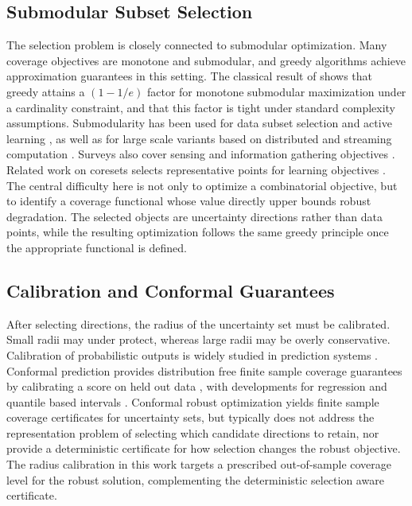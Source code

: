\documentclass[accepted]{uai2026}
\theoremstyle{plain}
\theoremstyle{definition}
\theoremstyle{remark}
\begin{document}
\subsection{Submodular Subset Selection}
The selection problem is closely connected to submodular optimization. Many coverage objectives are monotone and submodular, and greedy algorithms achieve approximation guarantees in this setting. The classical result of \cite{Nemhauser1978} shows that greedy attains a $(1-1/e)$ factor for monotone submodular maximization under a cardinality constraint, and that this factor is tight under standard complexity assumptions.
Submodularity has been used for data subset selection and active learning \citep{Wei2015}, as well as for large scale variants based on distributed and streaming computation \citep{Mirzasoleiman2015}. Surveys also cover sensing and information gathering objectives \citep{Krause2014}. Related work on coresets selects representative points for learning objectives \citep{Sener2018}.
The central difficulty here is not only to optimize a combinatorial objective, but to identify a coverage functional whose value directly upper bounds robust degradation. The selected objects are uncertainty directions rather than data points, while the resulting optimization follows the same greedy principle once the appropriate functional is defined.

\subsection{Calibration and Conformal Guarantees}
After selecting directions, the radius of the uncertainty set must be calibrated. Small radii may under protect, whereas large radii may be overly conservative. Calibration of probabilistic outputs is widely studied in prediction systems \citep{Zadrozny2002, Guo2017}.
Conformal prediction provides distribution free finite sample coverage guarantees by calibrating a score on held out data \citep{Vovk2005, Shafer2008}, with developments for regression and quantile based intervals \citep{Lei2018, Romano2019}.
Conformal robust optimization yields finite sample coverage certificates for uncertainty sets, but typically does not address the representation problem of selecting which candidate directions to retain, nor provide a deterministic certificate for how selection changes the robust objective. The radius calibration in this work targets a prescribed out-of-sample coverage level for the robust solution, complementing the deterministic selection aware certificate.
\end{document}

